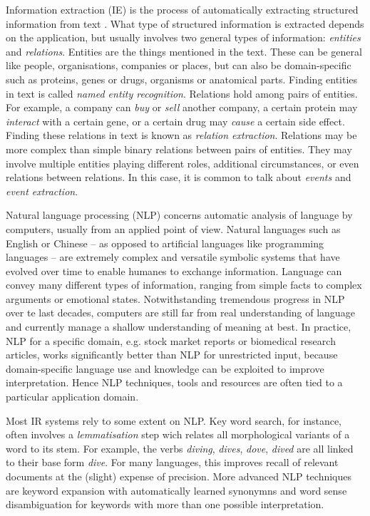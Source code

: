 Information extraction (IE) is the process of automatically extracting structured information from text \citep{Jiang2012Information}.
What type of structured information is extracted depends on the application, but usually involves two general types of information: \emph{entities} and \emph{relations}.
Entities are the things mentioned in the text.
These can be general like people, organisations, companies or places, but can also be domain-specific such as proteins, genes or drugs, organisms or anatomical parts.
Finding entities in text is called \emph{named entity recognition}.
Relations hold among pairs of entities.
For example, a company can \emph{buy} or \emph{sell} another company, a certain protein may \emph{interact} with a certain gene, or a certain drug may \emph{cause} a certain side effect.
Finding these relations in text is known as \emph{relation extraction}.  
Relations may be more complex than simple binary relations between pairs of entities.
They may involve multiple entities playing different roles, additional circumstances, or even relations between relations.
In this case, it is common to talk about \emph{events} and \emph{event extraction}.

Natural language processing (NLP) concerns automatic analysis of language by computers, usually from an applied point of view.  
Natural languages such as English or Chinese -- as opposed to artificial languages like programming languages -- are extremely complex and versatile symbolic systems that have evolved over time to enable humanes to exchange information.
Language can convey many different types of information, ranging from simple facts to complex arguments or emotional states.
Notwithstanding tremendous progress in NLP over te last decades, computers are still far from real understanding of language and currently manage a shallow understanding of meaning at best.
In practice, NLP for a specific domain, e.g. stock market reports or biomedical research articles, works significantly better than NLP for unrestricted input, because domain-specific language use and knowledge can be exploited to improve interpretation. 
Hence NLP techniques, tools and resources are often tied to a particular application domain.

Most IR systems rely to some extent on NLP.
Key word search, for instance, often involves a \emph{lemmatisation} step wich relates all morphological variants of a word to its stem.
For example, the verbs \emph{diving}, \emph{dives}, \emph{dove}, \emph{dived} are all linked to their base form \emph{dive}.
For many languages, this improves recall of relevant documents at the (slight) expense of precision.
More advanced NLP techniques are keyword expansion with automatically learned synonymns and word sense disambiguation for keywords with more than one possible interpretation.  

